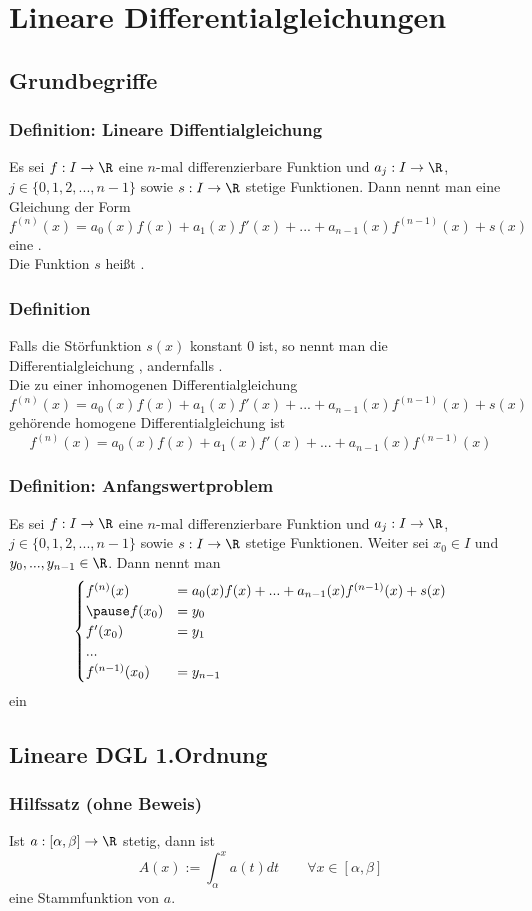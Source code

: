 \section{Lineare Differentialgleichungen}
\makeSectionDividerPage
\subsection{Grundbegriffe}
%
\begin{frame}\frametitle{Definition: Lineare Diffentialgleichung}
Es sei $f: I \to \R$ eine $n$-mal differenzierbare Funktion und $a_j : I \to \R$, $j\in \{0,1,2,...,n-1\}$ sowie $s:I \to \R$ stetige Funktionen. Dann nennt man eine Gleichung der Form
$$
f^{(n)}(x)=a_0(x)f(x)+a_1(x)f'(x)+...+a_{n-1}(x)f^{(n-1)}(x)+s(x)
$$
eine .\\[5mm]
Die Funktion $s$ heißt .
\end{frame}
%
%
\begin{frame}\frametitle{Definition}
Falls die Störfunktion $s(x)$ konstant $0$ ist, so nennt man die Differentialgleichung , andernfalls .\\\vfill \pause
Die zu einer inhomogenen Differentialgleichung
$$
f^{(n)}(x)=a_0(x)f(x)+a_1(x)f'(x)+...+a_{n-1}(x)f^{(n-1)}(x)+s(x)
$$
gehörende homogene Differentialgleichung ist
$$
f^{(n)}(x)=a_0(x)f(x)+a_1(x)f'(x)+...+a_{n-1}(x)f^{(n-1)}(x)
$$

\end{frame}
%
%
\begin{frame}\frametitle{Definition: Anfangswertproblem}
Es sei $f: I \to \R$ eine $n$-mal differenzierbare Funktion und $a_j : I \to \R$, $j\in \{0,1,2,...,n-1\}$ sowie $s:I \to \R$ stetige Funktionen. Weiter sei $x_0 \in I$ und $y_0,...,y_{n-1} \in \R$. Dann nennt man 
$$
\begin{cases}
f^{(n)}(x)&=a_0(x)f(x)+...+a_{n-1}(x)f^{(n-1)}(x)+s(x)\\ \pause
f(x_0)&=y_0\\
f'(x_0)&=y_1\\
...\\
f^{(n-1)}(x_0)&=y_{n-1}
\end{cases}
$$
ein 

\end{frame}
%
%
\subsection{Lineare DGL 1.Ordnung}
%
\begin{frame}\frametitle{Hilfssatz (ohne Beweis)}
Ist $a:[\alpha,\beta] \to \R$ stetig, dann ist 
$$
A(x):=\int_\alpha^x a(t)dt \qquad \forall x \in [\alpha,\beta]
$$
eine Stammfunktion von $a$.
	
\end{frame}
%

